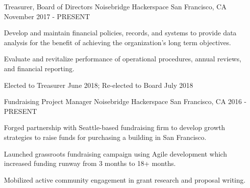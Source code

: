 

\begin{cventries}

  \cventry
    {Treasurer, Board of Directors} %
    {Noisebridge Hackerspace} %
    {San Francisco, CA} %
    {November 2017 - PRESENT} %
    {
      \begin{cvitems} %
        \item {Develop and maintain financial policies, records, and systems to provide data analysis for the benefit of achieving the organization's long term objectives.}
        \item {Evaluate and revitalize performance of operational procedures, annual reviews, and financial reporting.}
        \item {Elected to Treasurer June 2018; Re-elected to Board July 2018}       
      \end{cvitems}
    }

  \cventry
    {Fundraising Project Manager} %
    {Noisebridge Hackerspace} %
    {San Francisco, CA} %
    {2016 - PRESENT} %
    {
      \begin{cvitems} %
        \item {Forged partnership with Seattle-based fundraising firm to develop growth strategies to raise funds for purchasing a building in San Francisco.}
        \item {Launched grassroots fundraising campaign using Agile development which increased funding runway from 3 months to 18+ months.}
        \item {Mobilized active community engagement in grant research and proposal writing.}
      \end{cvitems}
    }


\end{cventries}

